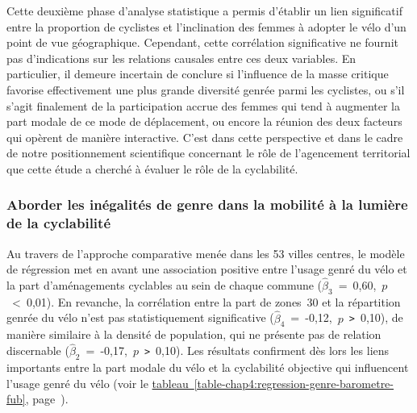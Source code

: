 \begin{refsegment}
Cette deuxième phase d'analyse statistique a permis d'établir un lien significatif entre la proportion de cyclistes et l'inclination des femmes à adopter le vélo d'un point de vue géographique. Cependant, cette corrélation significative ne fournit pas d'indications sur les relations causales entre ces deux variables. En particulier, il demeure incertain de conclure si l'influence de la masse critique favorise effectivement une plus grande diversité genrée parmi les cyclistes, ou s'il s'agit finalement de la participation accrue des femmes qui tend à augmenter la part modale de ce mode de déplacement, ou encore la réunion des deux facteurs qui opèrent de manière interactive. C'est dans cette perspective et dans le cadre de notre positionnement scientifique concernant le rôle de l'agencement territorial que cette étude a cherché à évaluer le rôle de la cyclabilité.%
    
\subsubsection*{Aborder les inégalités de genre dans la mobilité à la lumière de la cyclabilité
    \label{chap4:cyclabilite-genre}
    }

Au travers de l'approche comparative menée dans les 53 villes centres, le modèle de régression met en avant une association positive entre l'usage genré du vélo et la part d'aménagements cyclables au sein de chaque commune ($\hat{\beta}_{3}$~=~0,60,~$p$~\textless~0,01). En revanche, la corrélation entre la part de zones~30 et la répartition genrée du vélo n'est pas statistiquement significative ($\hat{\beta}_{4}$~=~-0,12,~$p$~\texttt{>}~0,10), de manière similaire à la densité de population, qui ne présente pas de relation discernable ($\hat{\beta}_{2}$~=~-0,17,~$p$~\texttt{>}~0,10). Les résultats confirment dès lors les liens importants entre la part modale du vélo et la cyclabilité objective \textcolor{blue}{\autocite[8]{codina_built_2022}} qui influencent l'usage genré du vélo (voir le \hyperref[table-chap4:regression-genre-barometre-fub]{tableau~\ref{table-chap4:regression-genre-barometre-fub}}, page~\pageref{table-chap4:regression-genre-barometre-fub}).%



\end{refsegment}
